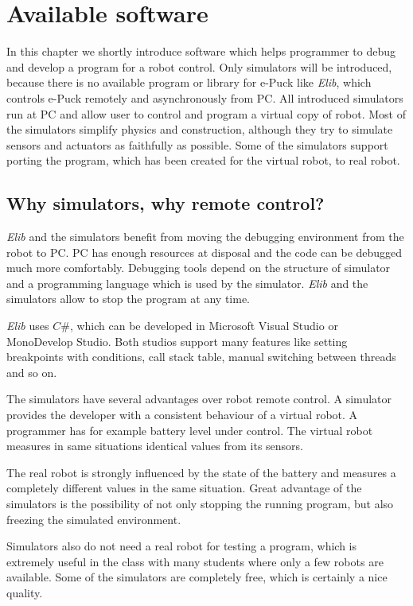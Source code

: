 \chapter{Available software} \label{chap:software}
	In this chapter we shortly introduce software which helps programmer
	to debug and develop a program for a robot control. Only simulators will be introduced, because 
	there is no available program or library for e-Puck like {\it Elib},
	which controls e-Puck remotely and asynchronously from PC.
	All introduced simulators run at PC and allow user to control and program a virtual copy of robot.
	Most of the simulators simplify physics and construction, although they try to simulate sensors
	and actuators as faithfully as possible. Some of the simulators support porting the program,
	which has been created for the virtual robot, to real robot.
	
\section{Why simulators, why remote control?}
	{\it Elib} and the simulators benefit from moving the debugging environment from the robot to PC.
	PC has enough resources at disposal and the code can be debugged much more comfortably. Debugging
	tools depend on the structure of simulator and a programming language which is used by the simulator.
	{\it Elib} and the simulators allow to stop the program at any time.
	
	{\it Elib} uses $C\#$, which can be developed in Microsoft Visual Studio or MonoDevelop Studio.
	Both studios support many features like setting breakpoints with conditions, call stack table,
	manual switching between threads and so on.
	
	The simulators have several advantages over robot remote control.
	A simulator provides the developer with a consistent behaviour of a virtual robot.
	A programmer has for example battery level under control. 
	The virtual robot measures in same situations identical values from its sensors. 
	
	The real robot is strongly influenced by the state of the battery
	and measures a completely different values in the same situation.
	Great advantage of the simulators is the possibility of not only stopping
	the running program, but also freezing the simulated environment. 
	
	Simulators also do not need a real robot for testing a program, which is extremely
	useful in the class with many students where only a few robots are available.
	Some of the simulators are completely free, which is certainly a nice quality.
	

